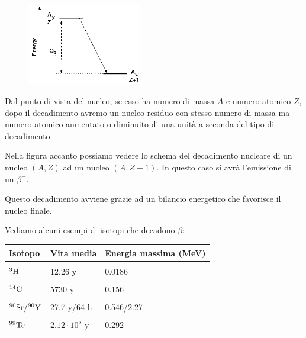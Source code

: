 \vspace{0.4cm}

\begin{minipage}{0.345\textwidth}
    \vspace{-0.6cm}
    \begin{figure}[H]
        \includegraphics[width=5cm]{immagini/Isotopi_beta.png}
    \end{figure}
\end{minipage}
\begin{minipage}{0.65\textwidth}
    Dal punto di vista del nucleo, se esso ha numero di massa $A$ e numero atomico $Z$, dopo il decadimento avremo un nucleo residuo con stesso numero di massa ma numero atomico aumentato o diminuito di una unità a seconda del tipo di decadimento.

    Nella figura accanto possiamo vedere lo schema del decadimento nucleare di un nucleo $(A,Z)$ ad un nucleo $(A,Z+1)$. In questo caso si avrà l'emissione di un $\beta^-$.
\end{minipage}

\vspace{0.4cm}Questo decadimento avviene grazie ad un bilancio energetico che favorisce il nucleo finale.

Vediamo alcuni esempi di isotopi che decadono $\beta$:

\begin{center}
    \begin{tabular}{|l|l|l|}
        \hline
        Isotopo & Vita media & Energia massima (MeV)\\
        \hline
        &&\\[-0.45cm]
        $\rm ^3H$ & 12.26 y & 0.0186\\
        \hline
        &&\\[-0.45cm]
        $\rm ^{14}C$ & 5730 y & 0.156\\
        \hline
        &&\\[-0.45cm]
        $\rm ^{90}Sr / ^{90}Y$ & 27.7 y/64 h & 0.546/2.27\\
        \hline
        &&\\[-0.45cm]
        $\rm ^{99}Tc$ & $2.12 \cdot 10^5$ y & 0.292\\
        \hline
    \end{tabular}
\end{center}


